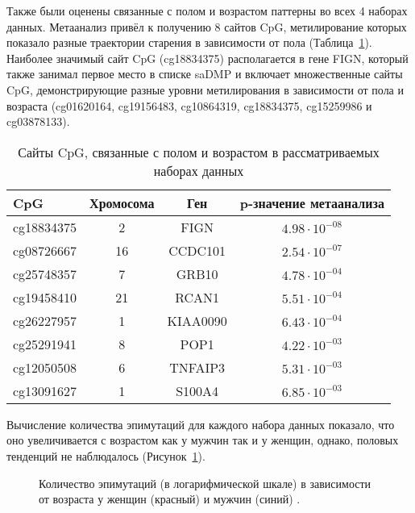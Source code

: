 Также были оценены связанные с полом и возрастом паттерны во всех 4 наборах данных. Метаанализ привёл к получению 8 сайтов CpG, метилирование которых показало разные траектории старения в зависимости от пола (Таблица~\ref{tab:saDMP}). Наиболее значимый сайт CpG (cg18834375) располагается в гене FIGN, который также занимал первое место в списке saDMP и включает множественные сайты CpG, демонстрирующие разные уровни метилирования в зависимости от пола и возраста (cg01620164, cg19156483, cg10864319, cg18834375, cg15259986 и cg03878133).

\begin{table} [htbp]
	\centering
	\begin{threeparttable}
		\caption{Сайты CpG, связанные с полом и возрастом в рассматриваемых наборах данных}\label{tab:saDMP}
		\begin{SingleSpace}
			\begin{tabular}{| l | c | c | c | }
				\hline
				CpG & Хромосома & Ген & p-значение метаанализа \\
				\hline
				cg18834375 & 2 & FIGN & $4.98 \cdot 10^{-08}$ \\
				\hline
				cg08726667 & 16 & CCDC101 & $2.54 \cdot 10^{-07}$ \\
				\hline
				cg25748357 & 7 & GRB10 & $4.78 \cdot 10^{-04}$  \\
				\hline
				cg19458410 & 21 & RCAN1 & $5.51 \cdot 10^{-04}$ \\
				\hline
				cg26227957 & 1 & KIAA0090 & $6.43 \cdot 10^{-04}$ \\
				\hline
				cg25291941 & 8 & POP1 & $4.22 \cdot 10^{-03}$ \\
				\hline
				cg12050508 & 6 & TNFAIP3 & $5.31 \cdot 10^{-03}$ \\
				\hline
				cg13091627 & 1 & S100A4 & $6.85 \cdot 10^{-03}$ \\
				\hline
			\end{tabular}%
		\end{SingleSpace}
	\end{threeparttable}
\end{table}

Вычисление количества эпимутаций для каждого набора данных показало, что оно увеличивается с возрастом как у мужчин так и у женщин, однако, половых тенденций не наблюдалось (Рисунок~\ref{fig:epimutations}). 

\begin{figure}[ht]
	\caption{Количество эпимутаций (в логарифмической шкале) в зависимости от возраста у женщин (красный) и мужчин (синий) \autocite{Yusipov2020}.}\label{fig:epimutations}
\end{figure}

